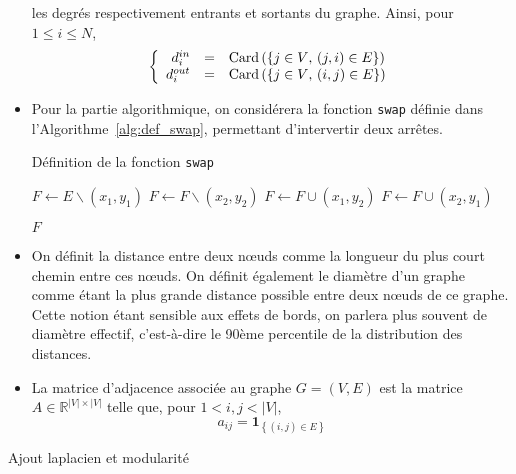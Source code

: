 \documentclass[a4paper]{article}
\newcommand{\tq}{\text{, }}
\newcommand{\card}[1]{\mathrm{Card}\left( #1 \right)}
\begin{document}
\begin{itemize}
        les degrés respectivement entrants et sortants du graphe. Ainsi,
        pour $1 \leq i \leq N$,
        \[
            \left\{
                \begin{array}{r c l}
                    d^{in}_i &=& \card{ \left\{ j \in V \tq (j, i) \in E \right\}} \\
                    d^{out}_i &=& \card{ \left\{ j \in V \tq (i, j) \in E \right\}} \\
                \end{array}
            \right.
        \]
    \item Pour la partie algorithmique, on considérera la fonction
        \texttt{swap} définie dans l'Algorithme~\ref{alg:def_swap}, permettant
        d'intervertir deux arrêtes.
    \begin{algorithm}
        \caption{Définition de la fonction \texttt{swap}}
        \label{alg:def_swap}
        \begin{algorithmic}[1]
                \State $F \gets E \backslash (x_1, y_1)$
                \State $F \gets F \backslash (x_2, y_2)$
                \State $F \gets F \cup (x_1, y_2)$
                \State $F \gets F \cup (x_2, y_1)$

                \Return $F$
            \EndFunction
        \end{algorithmic}
    \end{algorithm}

    \item On définit la distance entre deux n\oe{}uds comme la longueur du plus
        court chemin entre ces n\oe{}uds. On définit également le diamètre d'un
        graphe comme étant la plus grande distance possible entre deux
        n\oe{}uds de ce graphe. Cette notion étant sensible aux effets de bords,
        on parlera plus souvent de diamètre effectif, c'est-à-dire le 90ème
        percentile de la distribution des distances.

    \item La matrice d'adjacence associée au graphe $G = (V, E)$ est la matrice
        $A \in \mathbb{R}^{|V| \times |V|}$ telle que, pour $1 < i, j < |V|$,
        \[
            a_{ij} = \mathbf{1}_{\left\{ (i, j) \in E \right\}}
        \]
\end{itemize}

\begin{todo}
Ajout laplacien et modularité
\end{todo}
\end{document}
